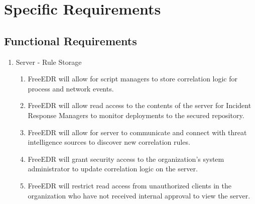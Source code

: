 \documentclass{scrreprt}
\begin{document}
\chapter{Specific Requirements}

\section{Functional Requirements}

\begin{enumerate}[label*=R\arabic*.]
    \item Server - Rule Storage
    \begin{enumerate}[label*=\arabic*.]
          \item FreeEDR will allow for script managers to store correlation logic for process and network events.
	\item FreeEDR will allow read access to the contents of the server for Incident Response Managers to monitor deployments to the secured repository.
	\item FreeEDR will allow for server to communicate and connect with threat intelligence sources to discover new correlation rules.
	\item FreeEDR will grant security access to the organization’s system administrator to update correlation logic on the server.
	\item FreeEDR will restrict read access from unauthorized clients in the organization who have not received internal approval to view the server. 
    \end{enumerate} 
\end{enumerate}
\end{document}
